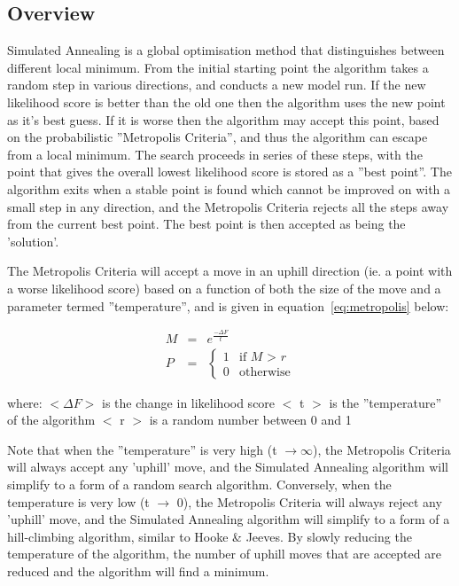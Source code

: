 \documentclass[10pt,twoside]{book}
\begin{document}
\subsection{Overview}\label{subsec:simannover}
Simulated Annealing is a global optimisation method that distinguishes between different local minimum.  From the initial starting point the algorithm takes a random step in various directions, and conducts a new model run.  If the new likelihood score is better than the old one then the algorithm uses the new point as it's best guess.  If it is worse then the algorithm may accept this point, based on the probabilistic ''Metropolis Criteria'', and thus the algorithm can escape from a local minimum.  The search proceeds in series of these steps, with the point that gives the overall lowest likelihood score is stored as a ''best point''.  The algorithm exits when a stable point is found which cannot be improved on with a small step in any direction, and the Metropolis Criteria rejects all the steps away from the current best point.  The best point is then accepted as being the 'solution'.

\bigskip
The Metropolis Criteria will accept a move in an uphill direction (ie. a point with a worse likelihood score) based on a function of both the size of the move and a parameter termed ''temperature'', and is given in equation~\ref{eq:metropolis} below:

\begin{eqnarray}\label{eq:metropolis}
M & = & e^{\displaystyle \frac{-\Delta F} {t}} \nonumber \\
P & = &
\begin{cases}
1 & \textrm{if $M$ > $r$} \\
0 & \textrm{otherwise}
\end{cases}
\end{eqnarray}

where:\newline
$<\Delta F>$ is the change in likelihood score\newline
$<$ t $>$ is the ''temperature'' of the algorithm\newline
$<$ r $>$ is a random number between 0 and 1

\bigskip
Note that when the ''temperature'' is very high (t $\rightarrow \infty$), the Metropolis Criteria will always accept any 'uphill' move, and the Simulated Annealing algorithm will simplify to a form of a random search algorithm.  Conversely, when the temperature is very low (t $\rightarrow$ 0), the Metropolis Criteria will always reject any 'uphill' move, and the Simulated Annealing algorithm will simplify to a form of a hill-climbing algorithm, similar to Hooke \& Jeeves.  By slowly reducing the temperature of the algorithm, the number of uphill moves that are accepted are reduced and the algorithm will find a minimum.
\end{document}
